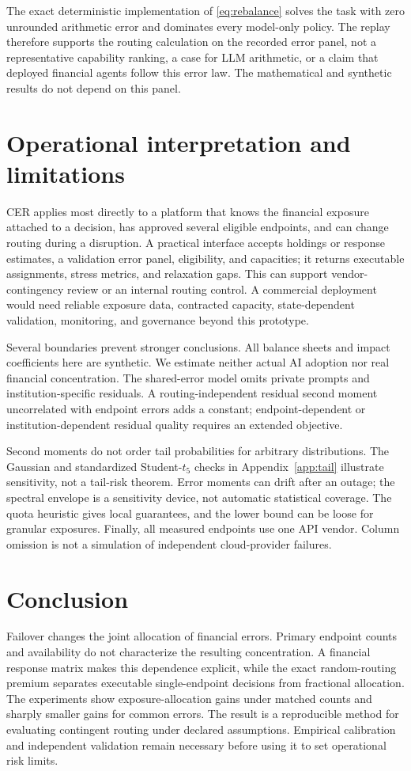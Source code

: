 \documentclass[11pt]{article}
\begin{document}
The exact deterministic implementation of \eqref{eq:rebalance} solves the task with zero unrounded arithmetic error and dominates every model-only policy. The replay therefore supports the routing calculation on the recorded error panel, not a representative capability ranking, a case for LLM arithmetic, or a claim that deployed financial agents follow this error law. The mathematical and synthetic results do not depend on this panel.

\section{Operational interpretation and limitations}
CER applies most directly to a platform that knows the financial exposure attached to a decision, has approved several eligible endpoints, and can change routing during a disruption. A practical interface accepts holdings or response estimates, a validation error panel, eligibility, and capacities; it returns executable assignments, stress metrics, and relaxation gaps. This can support vendor-contingency review or an internal routing control. A commercial deployment would need reliable exposure data, contracted capacity, state-dependent validation, monitoring, and governance beyond this prototype.

Several boundaries prevent stronger conclusions. All balance sheets and impact coefficients here are synthetic. We estimate neither actual AI adoption nor real financial concentration. The shared-error model omits private prompts and institution-specific residuals. A routing-independent residual second moment uncorrelated with endpoint errors adds a constant; endpoint-dependent or institution-dependent residual quality requires an extended objective.

Second moments do not order tail probabilities for arbitrary distributions. The Gaussian and standardized Student-\(t_5\) checks in Appendix~\ref{app:tail} illustrate sensitivity, not a tail-risk theorem. Error moments can drift after an outage; the spectral envelope is a sensitivity device, not automatic statistical coverage. The quota heuristic gives local guarantees, and the lower bound can be loose for granular exposures. Finally, all measured endpoints use one API vendor. Column omission is not a simulation of independent cloud-provider failures.

\section{Conclusion}
Failover changes the joint allocation of financial errors. Primary endpoint counts and availability do not characterize the resulting concentration. A financial response matrix makes this dependence explicit, while the exact random-routing premium separates executable single-endpoint decisions from fractional allocation. The experiments show exposure-allocation gains under matched counts and sharply smaller gains for common errors. The result is a reproducible method for evaluating contingent routing under declared assumptions. Empirical calibration and independent validation remain necessary before using it to set operational risk limits.
\end{document}
